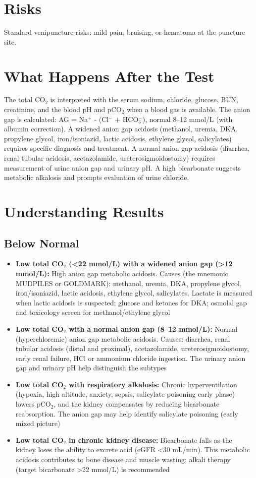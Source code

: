 \section*{Risks}
Standard venipuncture risks: mild pain, bruising, or hematoma at the puncture site.

\section*{What Happens After the Test}
The total CO$_2$ is interpreted with the serum sodium, chloride, glucose, BUN, creatinine, and the blood pH and pCO$_2$ when a blood gas is available. The anion gap is calculated: AG = Na$^+$ - (Cl$^-$ + HCO$_3^-$), normal 8--12 mmol/L (with albumin correction). A widened anion gap acidosis (methanol, uremia, DKA, propylene glycol, iron/isoniazid, lactic acidosis, ethylene glycol, salicylates) requires specific diagnosis and treatment. A normal anion gap acidosis (diarrhea, renal tubular acidosis, acetazolamide, ureterosigmoidostomy) requires measurement of urine anion gap and urinary pH. A high bicarbonate suggests metabolic alkalosis and prompts evaluation of urine chloride.

\section*{Understanding Results}

\subsection*{Below Normal}
\begin{itemize}
  \item \textbf{Low total CO$_2$ (<22 mmol/L) with a widened anion gap (>12 mmol/L):} High anion gap metabolic acidosis. Causes (the mnemonic MUDPILES or GOLDMARK): methanol, uremia, DKA, propylene glycol, iron/isoniazid, lactic acidosis, ethylene glycol, salicylates. Lactate is measured when lactic acidosis is suspected; glucose and ketones for DKA; osmolal gap and toxicology screen for methanol/ethylene glycol
  \item \textbf{Low total CO$_2$ with a normal anion gap (8--12 mmol/L):} Normal (hyperchloremic) anion gap metabolic acidosis. Causes: diarrhea, renal tubular acidosis (distal and proximal), acetazolamide, ureterosigmoidostomy, early renal failure, HCl or ammonium chloride ingestion. The urinary anion gap and urinary pH help distinguish the subtypes
  \item \textbf{Low total CO$_2$ with respiratory alkalosis:} Chronic hyperventilation (hypoxia, high altitude, anxiety, sepsis, salicylate poisoning early phase) lowers pCO$_2$, and the kidney compensates by reducing bicarbonate reabsorption. The anion gap may help identify salicylate poisoning (early mixed picture)
  \item \textbf{Low total CO$_2$ in chronic kidney disease:} Bicarbonate falls as the kidney loses the ability to excrete acid (eGFR <30 mL/min). This metabolic acidosis contributes to bone disease and muscle wasting; alkali therapy (target bicarbonate >22 mmol/L) is recommended
\end{itemize}

